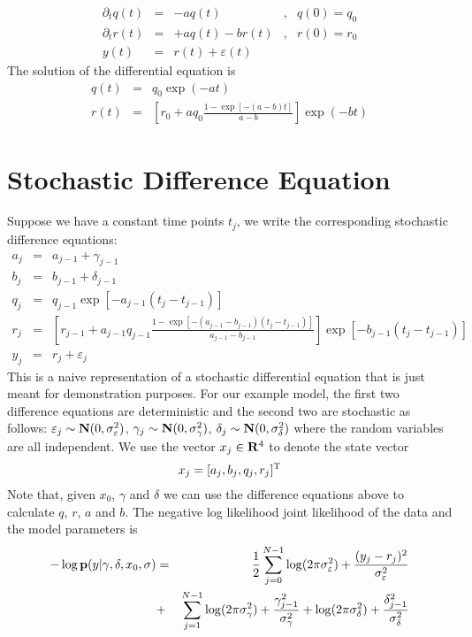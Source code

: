 \documentclass{article}
\newcommand{\BN}{{\bf N}}
\newcommand{\BR}{{\bf R}}
\newcommand{\RT}{{\rm T}}
\newcommand{\Bp}{{\bf p}}
\begin{document}
\[
\begin{array}{rcllcl}
\partial_t q(t) & = & - a q(t)                     & , & q(0) = q_0  
\\
\partial_t r(t) & = & + a q(t) - b r(t)            & , & r(0) = r_0
\\
y(t)                      & = & r(t) + \varepsilon (t)
\end{array}
\]
The solution of the differential equation is
\begin{eqnarray*}
q(t) & = & q_0 \exp ( - a t )
\\
r(t) & = & \left[ 
	r_0 + a q_0 \frac{ 1  - \exp[ - (a - b) t ] }{ a - b } 
\right] \exp( - b t )
\end{eqnarray*}


\section{Stochastic Difference Equation}
Suppose we have a constant time points \( t_j \),
we write the corresponding stochastic difference equations:
\begin{eqnarray*}
a_j & = & a_{j-1} + \gamma_{j-1}
\\
b_j & = & b_{j-1} + \delta_{j-1}
\\
q_j & = & q_{j-1} \exp [ - a_{j-1} ( t_j - t_{j-1} ) ] 
\\ 
r_j & = & 
\left [ r_{j-1} + a_{j-1} q_{j-1} 
	\frac{ 1 - \exp[ - (a_{j-1} - b_{j-1}) ( t_j - t_{j-1} ) ] }
		{ a_{j-1} - b_{j-1} }
\right] \exp[ - b_{j-1} ( t_j - t_{j-1} ) ]
\\
y_j     & = & r_j + \varepsilon_j
\end{eqnarray*}
This is a naive representation of a stochastic differential equation that
is just meant for demonstration purposes.
For our example model,
the first two difference equations are deterministic
and the second two are stochastic as follows:
\( \varepsilon_j \sim \BN(0, \sigma_\varepsilon^2 ) \),
\( \gamma_j \sim \BN(0, \sigma_\gamma^2 ) \),
\( \delta_j \sim \BN(0, \sigma_\delta^2 ) \)
where the random variables are all independent.
We use the vector \( x_j \in \BR^4 \) to denote the state vector
\[
x_j = [ a_j , b_j, q_j , r_j ]^\RT
\]
Note that, given \( x_0 \), \( \gamma \) and \( \delta \)
we can use the difference equations above to calculate 
\(  q \), \( r \), \( a \) and \( b \).
The negative log likelihood joint likelihood of the 
data and the model parameters is
\begin{eqnarray*}
- \log \Bp (y | \gamma , \delta, x_0, \sigma ) & = &
\frac{1}{2} \sum_{j=0}^{N-1} 
\log( 2 \pi \sigma_\varepsilon^2 )
+
\frac{ (y_j - r_j )^2 }{ \sigma_\varepsilon^2 } 
\\
& + &
\sum_{j=1}^{N-1}
\log( 2 \pi \sigma_\gamma^2 )
+
\frac{ \gamma_{j-1}^2 }{ \sigma_\gamma^2 } 
+
\log( 2 \pi \sigma_\delta^2 )
+
\frac{ \delta_{j-1}^2 }{ \sigma_\delta^2 } 
\end{eqnarray*}
\end{document}
